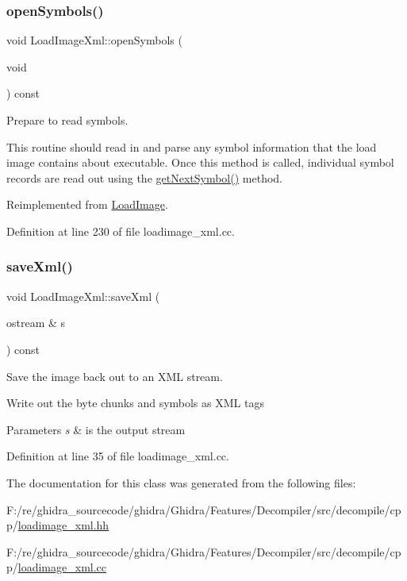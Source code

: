 \subsubsection{\texorpdfstring{openSymbols()}{openSymbols()}}
{\footnotesize\ttfamily void Load\+Image\+Xml\+::open\+Symbols (\begin{DoxyParamCaption}\item[{void}]{ }\end{DoxyParamCaption}) const\hspace{0.3cm}{\ttfamily [virtual]}}



Prepare to read symbols. 

This routine should read in and parse any symbol information that the load image contains about executable. Once this method is called, individual symbol records are read out using the \mbox{\hyperlink{class_load_image_xml_ab0a1e2aee8d5d8925e29662f32fa2060}{get\+Next\+Symbol()}} method. 

Reimplemented from \mbox{\hyperlink{class_load_image_a5b17f1d68413ab802966bdc7aa07cc73}{Load\+Image}}.



Definition at line 230 of file loadimage\+\_\+xml.\+cc.

\mbox{\label{class_load_image_xml_a299156268ffc721a01871095d1d93a73}} 
\subsubsection{\texorpdfstring{saveXml()}{saveXml()}}
{\footnotesize\ttfamily void Load\+Image\+Xml\+::save\+Xml (\begin{DoxyParamCaption}\item[{ostream \&}]{s }\end{DoxyParamCaption}) const}



Save the image back out to an X\+ML stream. 

Write out the byte chunks and symbols as X\+ML tags 
\begin{DoxyParams}{Parameters}
{\em s} & is the output stream \\
\hline
\end{DoxyParams}


Definition at line 35 of file loadimage\+\_\+xml.\+cc.



The documentation for this class was generated from the following files\+:\begin{DoxyCompactItemize}
\item 
F\+:/re/ghidra\+\_\+sourcecode/ghidra/\+Ghidra/\+Features/\+Decompiler/src/decompile/cpp/\mbox{\hyperlink{loadimage__xml_8hh}{loadimage\+\_\+xml.\+hh}}\item 
F\+:/re/ghidra\+\_\+sourcecode/ghidra/\+Ghidra/\+Features/\+Decompiler/src/decompile/cpp/\mbox{\hyperlink{loadimage__xml_8cc}{loadimage\+\_\+xml.\+cc}}\end{DoxyCompactItemize}
